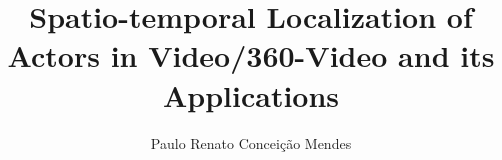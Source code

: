 \documentclass[phd,american]{ThesisPUC}
\author{Paulo Renato Conceição Mendes}
\title{Spatio-temporal Localization of Actors   in Video/360-Video and its Applications}
\begin{document}








\arial


%


\end{document}
